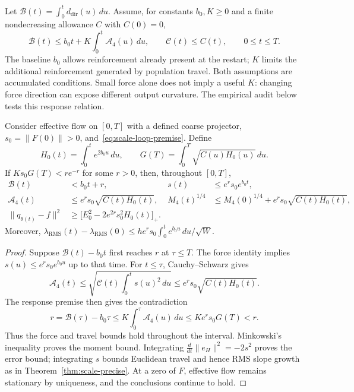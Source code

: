 Let $\mathcal B(t)=\int_0^t d_{\mathrm{dir}}(u)\,du$. Assume, for
constants $b_0,K\ge0$ and a finite nondecreasing allowance $C$ with $C(0)=0$,
\begin{equation}
\mathcal B(t)\le b_0t+K\int_0^t\mathcal A_4(u)\,du,
\qquad \mathcal C(t)\le C(t),\qquad 0\le t\le T.
\label{eq:scale-loop-premise}
\end{equation}
The baseline $b_0$ allows reinforcement already present at the restart;
$K$ limits the additional reinforcement generated by population travel.
Both assumptions are accumulated conditions. Small force alone does not
imply a useful $K$: changing force direction can expose different output
curvature. The empirical audit below tests this response relation.

\begin{theorem}
\label{thm:scale-loop}
Consider effective flow on $[0,T]$ with a defined coarse projector,
$s_0=\|F(0)\|>0$, and~\eqref{eq:scale-loop-premise}. Define
\begin{equation}
H_0(t)=\int_0^t e^{2b_0u}\,du,\qquad
G(T)=\int_0^T\sqrt{C(u)H_0(u)}\,du.
\end{equation}
If $K s_0G(T)<r e^{-r}$ for some $r>0$, then, throughout $[0,T]$,
\begin{align}
\mathcal B(t)&<b_0t+r,&s(t)&\le e^r s_0e^{b_0t},\label{eq:scale-loop-force}\\
\mathcal A_4(t)&\le e^r s_0\sqrt{C(t)H_0(t)},&
M_4(t)^{1/4}&\le M_4(0)^{1/4}+e^r s_0\sqrt{C(t)H_0(t)},\label{eq:scale-loop-moment}\\
\|q_{\theta(t)}-f\|^2&\ge
\bigl[E_0^2-2e^{2r}s_0^2H_0(t)\bigr]_+.\label{eq:scale-loop-error}
\end{align}
Moreover, $\lambda_{\mathrm{RMS}}(t)-\lambda_{\mathrm{RMS}}(0)
\le h e^r s_0\int_0^t e^{b_0u}\,du/\sqrt W$.
\end{theorem}
\begin{proof}
Suppose $\mathcal B(t)-b_0t$ first reaches $r$ at $\tau\le T$.
The force identity implies $s(u)\le e^r s_0e^{b_0u}$ up to that time.
For $t\le\tau$, Cauchy--Schwarz gives
\begin{equation}
\mathcal A_4(t)\le
\sqrt{\mathcal C(t)\int_0^t s(u)^2\,du}
\le e^r s_0\sqrt{C(t)H_0(t)}.
\end{equation}
The response premise then gives the contradiction
\begin{equation}
r=\mathcal B(\tau)-b_0\tau
\le K\int_0^\tau\mathcal A_4(u)\,du
\le K e^r s_0G(T)<r.
\end{equation}
Thus the force and travel bounds hold throughout the interval. Minkowski's
inequality proves the moment bound. Integrating
$\frac{d}{dt}\|e_H\|^2=-2s^2$ proves the error bound; integrating $s$
bounds Euclidean travel and hence RMS slope growth as in
Theorem~\ref{thm:scale-precise}. At a zero of $F$, effective flow remains
stationary by uniqueness, and the conclusions continue to hold.
\end{proof}

